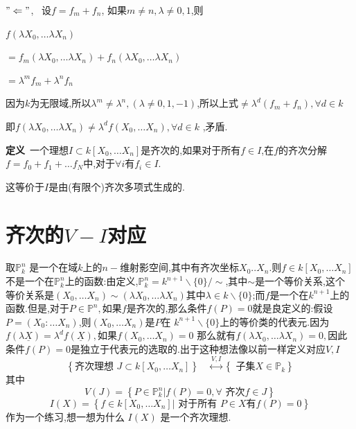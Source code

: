 \documentclass[UTF8]{book}
\begin{document}
		$"\Leftarrow" $, \ 设$f=f_{m}+f_{n}	$, 如果$m\neq n	,\lambda \neq 0,1$,则
		
		$f \left(\lambda X _{0}, \ldots \lambda X _{ n }\right)$
		
		$=f_{m} \left(\lambda X _{0}, \ldots \lambda X _{ n }\right)+f_{n} \left(\lambda X _{0}, \ldots \lambda X _{ n }\right)$
		
		$=\lambda^{m}f_{m}+\lambda^{n}f_{n}$
		
		因为$ k $为无限域,所以$\lambda^{m} \neq \lambda^{n},(\lambda \neq 0,1,-1)$,所以上式$ \neq \lambda^{d}(f_{m}+f_{n}),\forall d\in k$
		
		即$f \left(\lambda X _{0}, \ldots \lambda X _{ n }\right) \neq \lambda^{d}f \left( X _{0}, \ldots X _{ n }\right),\forall d\in k$ ,矛盾.
		
		
		\textbf{定义}\ 一个理想$I \subset k \left[ X _{0}, \ldots X _{ n }\right]$是齐次的,如果对于所有$f \in I$,在$ f $的齐次分解$f = f _{0}+ f _{1}+\ldots f _{ N }$中,对于$ \forall i $有$f _{ i } \in I$.
		
		
		这等价于$ I $是由(有限个)齐次多项式生成的.
		
		
	\section{齐次的$ V-I $对应}
		取$\mathbb{P} ^{n}_{k}$ 是一个在域$ k $上的$ n- $维射影空间,其中有齐次坐标$X _{0} . . X _{ n }$.则$f \in k \left[ X _{0}, \ldots X _{ n }\right]$不是一个在$\mathbb{P} ^{ n }_{k} $上的函数:由定义,$\mathbb{P} ^{ n }_{ k }= k ^{ n +1} \backslash\{0\} / \sim$,其中$\sim$是一个等价关系,这个等价关系是$\left( X _{0}, \ldots X _{ n }\right) \sim\left(\lambda X _{0}, \ldots \lambda X _{ n }\right)$其中$\lambda \in k \backslash\{0\} $;而$ f $是一个在$k ^{n+1}$上的函数.但是,对于$P \in \mathbb{P}^{n} ,$如果$ f $是齐次的,那么条件$f ( P )=0$就是良定义的:假设$P =\left( X _{0}: \dots X _{ n }\right)$,则$\left(X_{0}, \ldots X_{n}\right)$是$ P $在 $k^{n+1} \backslash\{0\}$上的等价类的代表元.因为$f(\lambda \underline{X})=\lambda^{d} f(\underline{X}),$如果$f\left(X_{0}, \ldots X_{n}\right)=0$ 那么就有$f\left(\lambda X_{0}, \ldots \lambda X_{n}\right)=0,$因此条件$f ( P )=0$是独立于代表元的选取的.出于这种想法像以前一样定义对应$ V,I $
		\begin{equation*}
		\left\{\text {齐次理想 } J \subset k \left[ X _{0}, \dots X _{ n }\right]\right\} \quad \stackrel{ V , I }{\longleftrightarrow}\left\{\text { 子集} X \in \mathbb{P} _{ k }\right\}
		\end{equation*}
		其中
		\begin{equation*}
		V ( J )=\left\{ P \in \mathbb{P} ^{ n }_{k} | f ( P )=0, \forall \text { 齐次} f \in J \right\}
		\end{equation*}
		\begin{equation*}
		I ( X )=\left\{ f \in k \left[ X _{0}, \ldots X _{ n }\right] |  \text { 对于所有 } P \in X \text{有} f ( P )=0\right\}
		\end{equation*}
		作为一个练习,想一想为什么 $I ( X )$ 是一个齐次理想.
		
\end{document}
